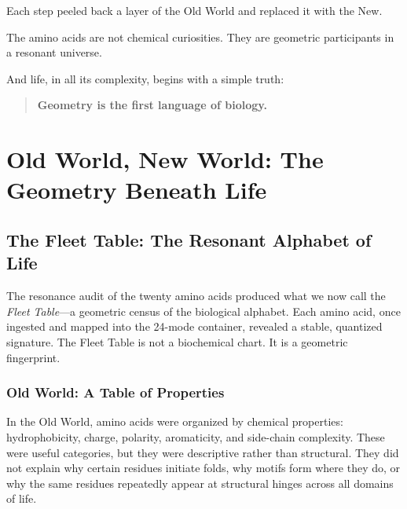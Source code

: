 \documentclass[11pt, letterpaper, openany]{book}
\begin{document}
Each step peeled back a layer of the Old World and replaced it with the New.

The amino acids are not chemical curiosities.  
They are geometric participants in a resonant universe.

And life, in all its complexity, begins with a simple truth:

\begin{quote}
\textbf{Geometry is the first language of biology.}
\end{quote}

\chapter{Old World, New World: The Geometry Beneath Life}


\section{The Fleet Table: The Resonant Alphabet of Life}

The resonance audit of the twenty amino acids produced what we now call the
\textit{Fleet Table}---a geometric census of the biological alphabet. Each amino
acid, once ingested and mapped into the 24-mode container, revealed a stable,
quantized signature. The Fleet Table is not a biochemical chart. It is a
geometric fingerprint.

\subsection*{Old World: A Table of Properties}

In the Old World, amino acids were organized by chemical properties:
hydrophobicity, charge, polarity, aromaticity, and side-chain complexity. These
were useful categories, but they were descriptive rather than structural. They
did not explain why certain residues initiate folds, why motifs form where they
do, or why the same residues repeatedly appear at structural hinges across all
domains of life.
\end{document}
